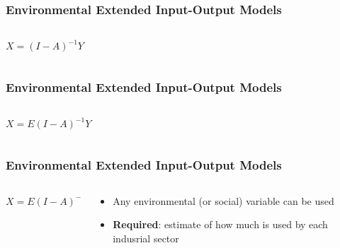 \documentclass[aspectratio=169]{beamer}
\begin{document}
\begin{frame}
  \frametitle{Environmental Extended Input-Output Models}
\begin{columns}
\begin{column}{0.5\textwidth}
\begin{center}
$X = (I - A)^{-1}Y$
\end{center}
\end{column}
\begin{column}{0.5\textwidth}  %

\end{column}
\end{columns}
\end{frame}

\begin{frame}
  \frametitle{Environmental Extended Input-Output Models}
\begin{columns}
\begin{column}{0.5\textwidth}
\begin{center}
$X = E(I - A)^{-1}Y$
\end{center}
\end{column}
\begin{column}{0.5\textwidth}  %

\end{column}
\end{columns}
\end{frame}


\begin{frame}
  \frametitle{Environmental Extended Input-Output Models}
\begin{columns}
\begin{column}{0.5\textwidth}
\begin{center}
$X = E(I - A)^{-1}Y$
\end{center}
\end{column}
\begin{column}{0.5\textwidth}  %
  \begin{itemize}
  \item Any environmental (or social) variable can be used \pause
  \item \textbf{Required}: estimate of how much is used by each
  indusrial sector
  \end{itemize}
\end{column}
\end{columns}
\end{frame}
\end{document}
